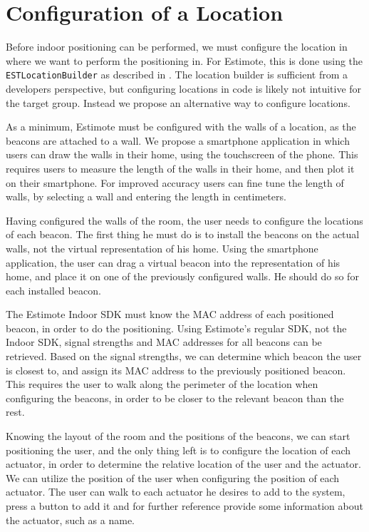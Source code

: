 \section{Configuration of a Location}
Before indoor positioning can be performed, 
we must configure the location in where we want to perform the positioning in. 
For Estimote, this is done using the \texttt{ESTLocationBuilder} as described in . 
The location builder is sufficient from a developers perspective, 
but configuring locations in code is likely not intuitive for the target group. 
Instead we propose an alternative way to configure locations.

As a minimum, Estimote must be configured with the walls of a location, 
as the beacons are attached to a wall. 
We propose a smartphone application in which users can draw the walls in their home, 
using the touchscreen of the phone. 
This requires users to measure the length of the walls in their home, 
and then plot it on their smartphone. 
For improved accuracy users can fine tune the length of walls, 
by selecting a wall and entering the length in centimeters.

Having configured the walls of the room, 
the user needs to configure the locations of each beacon. 
The first thing he must do is to install the beacons on the actual walls, 
\ie not the virtual representation of his home.
Using the smartphone application, the user can drag a virtual beacon into the representation of his home, 
and place it on one of the previously configured walls. 
He should do so for each installed beacon.


The Estimote Indoor SDK must know the MAC address of each positioned beacon, 
in order to do the positioning. 
Using Estimote's regular SDK, \ie not the Indoor SDK, 
signal strengths and MAC addresses for all beacons can be retrieved. 
Based on the signal strengths, 
we can determine which beacon the user is closest to, 
and assign its MAC address to the previously positioned beacon. 
This requires the user to walk along the perimeter of the location when configuring the beacons, 
in order to be closer to the relevant beacon than the rest.

Knowing the layout of the room and the positions of the beacons, 
we can start positioning the user, 
and the only thing left is to configure the location of each actuator, 
in order to determine the relative location of the user and the actuator. 
We can utilize the position of the user when configuring the position of each actuator. 
The user can walk to each actuator he desires to add to the system, 
press a button to add it and for further reference provide some information about the actuator, such as a name.

